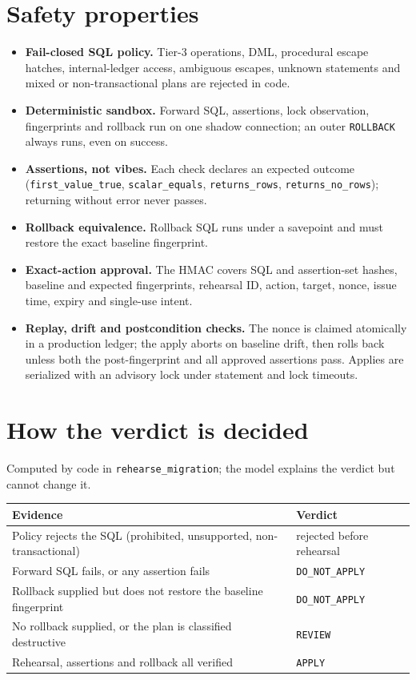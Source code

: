\documentclass[10pt,a4paper]{article}
\begin{document}
\clearpage

\section*{Safety properties}
\begin{itemize}
  \item \textbf{Fail-closed SQL policy.} Tier-3 operations, DML, procedural escape hatches, internal-ledger
  access, ambiguous escapes, unknown statements and mixed or non-transactional plans are rejected in code.
  \item \textbf{Deterministic sandbox.} Forward SQL, assertions, lock observation, fingerprints and rollback run on one
  shadow connection; an outer \texttt{ROLLBACK} always runs, even on success.
  \item \textbf{Assertions, not vibes.} Each check declares an expected outcome (\texttt{first\_value\_true},
  \texttt{scalar\_equals}, \texttt{returns\_rows}, \texttt{returns\_no\_rows}); returning without error never passes.
  \item \textbf{Rollback equivalence.} Rollback SQL runs under a savepoint and must restore the exact baseline fingerprint.
  \item \textbf{Exact-action approval.} The HMAC covers SQL and assertion-set hashes, baseline and expected fingerprints,
  rehearsal ID, action, target, nonce, issue time, expiry and single-use intent.
  \item \textbf{Replay, drift and postcondition checks.} The nonce is claimed atomically in a production ledger; the
  apply aborts on baseline drift, then rolls back unless both the post-fingerprint and all approved assertions pass.
  Applies are serialized with an advisory lock under statement and lock timeouts.
\end{itemize}

\section*{How the verdict is decided}
Computed by code in \texttt{rehearse\_migration}; the model explains the verdict but cannot change it.

\begin{tabularx}{\linewidth}{@{}Xl@{}}
\toprule
\textbf{Evidence} & \textbf{Verdict} \\
\midrule
Policy rejects the SQL (prohibited, unsupported, non-transactional) & rejected before rehearsal \\
Forward SQL fails, or any assertion fails                           & \texttt{DO\_NOT\_APPLY} \\
Rollback supplied but does not restore the baseline fingerprint     & \texttt{DO\_NOT\_APPLY} \\
No rollback supplied, or the plan is classified destructive         & \texttt{REVIEW} \\
Rehearsal, assertions and rollback all verified                     & \texttt{APPLY} \\
\bottomrule
\end{tabularx}
\end{document}

